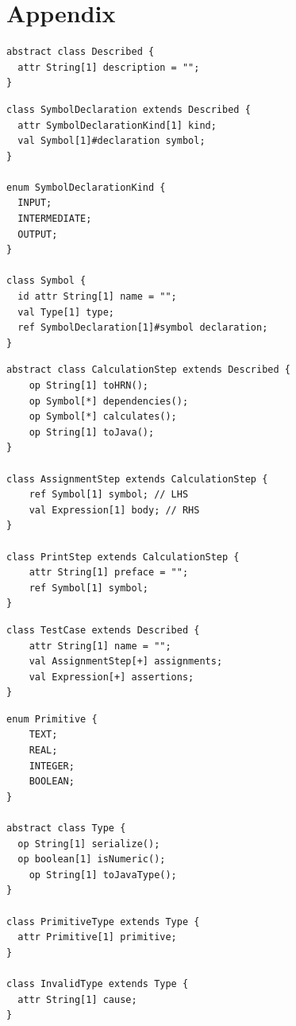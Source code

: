 \documentclass[11pt,fleqn]{article}
\begin{document}
\newpage{}

\printbibliography[heading=bibintoc]

\newpage{}

\section*{Appendix}
\label{sec:appendix}

\begin{lstlisting}[caption={Abstract Class: Described},label={lst:described}]
abstract class Described {
  attr String[1] description = "";
}
\end{lstlisting}

\begin{lstlisting}[caption={Symbol Declarations},label={lst:symbol-declarations}]
class SymbolDeclaration extends Described {
  attr SymbolDeclarationKind[1] kind;
  val Symbol[1]#declaration symbol;
}

enum SymbolDeclarationKind {
  INPUT;
  INTERMEDIATE;
  OUTPUT;
}

class Symbol {
  id attr String[1] name = "";
  val Type[1] type;
  ref SymbolDeclaration[1]#symbol declaration;
}
\end{lstlisting}

\begin{lstlisting}[caption={Calculation Steps},label={lst:calculation-steps}]
abstract class CalculationStep extends Described {
	op String[1] toHRN();
	op Symbol[*] dependencies();
	op Symbol[*] calculates();
	op String[1] toJava();
}

class AssignmentStep extends CalculationStep {
	ref Symbol[1] symbol; // LHS
	val Expression[1] body; // RHS
}

class PrintStep extends CalculationStep {
	attr String[1] preface = "";
	ref Symbol[1] symbol;
}
\end{lstlisting}

\begin{lstlisting}[caption={Test Case},label={lst:test-case}]
class TestCase extends Described {
	attr String[1] name = "";
	val AssignmentStep[+] assignments;
	val Expression[+] assertions;
}
\end{lstlisting}

\begin{lstlisting}[caption={Type Universe},label={lst:type-universe}]
enum Primitive {
	TEXT;
	REAL;
	INTEGER;
	BOOLEAN;
}

abstract class Type {
  op String[1] serialize();
  op boolean[1] isNumeric();
	op String[1] toJavaType();
}

class PrimitiveType extends Type {
  attr Primitive[1] primitive;
}

class InvalidType extends Type {
  attr String[1] cause;
}
\end{lstlisting}
\end{document}
